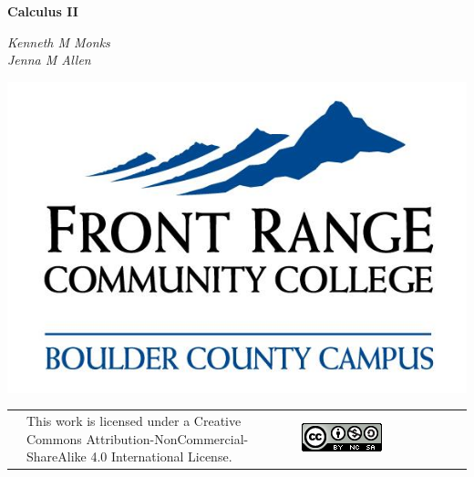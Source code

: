 
    \begin{titlepage}
    \centering 
    \vspace*{.5in}
    {\Huge \bf Calculus II\par}
    \vspace{1.5cm}
    {\Large\itshape Kenneth M Monks \\ Jenna M Allen \par}


    \vfill
    \includegraphics[width=.4\textwidth]{Titlepage/FRCCLogo}\par\vspace{1cm}
    
 \vfill
 
 \begin{tabular}{c p{0.6\linewidth}c p{0.4\linewidth}} \hspace*{.5in}
 & \vspace*{.01in} This work is licensed under a Creative Commons Attribution-NonCommercial-ShareAlike 4.0 International License. &\hspace*{.1in} & \vspace*{.01in} \href{https://creativecommons.org/licenses/by-nc-sa/4.0/}{\includegraphics{Titlepage/CreativeCommonsLicense}}
 \end{tabular}
 
    \end{titlepage}